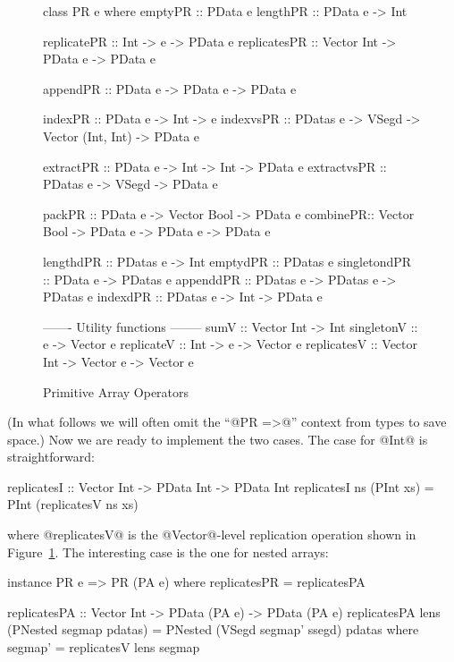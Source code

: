 \begin{figure}
\begin{small}
\begin{code}
class PR e where
emptyPR      :: PData  e
lengthPR     :: PData  e -> Int                                   

replicatePR  :: Int        -> e       -> PData e
replicatesPR :: Vector Int -> PData e -> PData e

appendPR     :: PData  e -> PData e -> PData e

indexPR      :: PData  e -> Int -> e                              
indexvsPR    :: PDatas e -> VSegd 
             -> Vector (Int, Int) -> PData e

extractPR    :: PData  e -> Int   -> Int -> PData e
extractvsPR  :: PDatas e -> VSegd -> PData e

packPR   :: PData  e -> Vector Bool -> PData e
combinePR:: Vector Bool -> PData e -> PData e -> PData e

lengthdPR    :: PDatas e -> Int
emptydPR     :: PDatas e
singletondPR :: PData  e -> PDatas e
appenddPR    :: PDatas e -> PDatas e -> PDatas e
indexdPR     :: PDatas e -> Int -> PData e

------- Utility functions --------
sumV        :: Vector Int -> Int
singletonV  :: e -> Vector e
replicateV  :: Int -> e -> Vector e
replicatesV :: Vector Int -> Vector e -> Vector e
\end{code}
\end{small}
\caption{Primitive Array Operators}
\label{figure:NewArrayOperators}
\end{figure}
%
\noindent
(In what follows we will often omit the ``@PR =>@'' context from types to save space.)
Now we are ready to implement the two cases.
The case for @Int@ is straightforward:
\par
\begin{small}
\begin{code}
 replicatesI :: Vector Int -> PData Int -> PData Int
 replicatesI ns (PInt xs) = PInt (replicatesV ns xs)
\end{code}
\end{small}
\par
\noindent
where @replicatesV@ is the @Vector@-level replication operation shown in Figure~\ref{figure:NewArrayOperators}. The interesting case is the one for nested arrays:
\par
\begin{small}
\begin{code}
 instance PR e => PR (PA e) where
  replicatesPR = replicatesPA

 replicatesPA :: Vector Int -> PData (PA e) -> PData (PA e)
 replicatesPA lens (PNested segmap pdatas)
  = PNested (VSegd segmap' ssegd) pdatas
  where segmap' = replicatesV lens segmap
\end{code}
\end{small}
